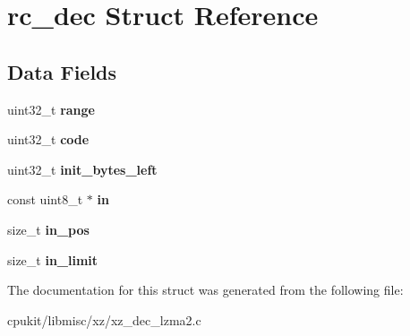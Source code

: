 \hypertarget{structrc__dec}{}\section{rc\+\_\+dec Struct Reference}
\label{structrc__dec}
\subsection*{Data Fields}
\begin{DoxyCompactItemize}
\item 
\mbox{\label{structrc__dec_a0b30be2ebf0215cdeaaa3d5a28b8e4e2}} 
uint32\+\_\+t {\bfseries range}
\item 
\mbox{\label{structrc__dec_a78845f77e6d0849c6861a5fa3f26940d}} 
uint32\+\_\+t {\bfseries code}
\item 
\mbox{\label{structrc__dec_a16ad52a1ab5f74a06dc55228de488b61}} 
uint32\+\_\+t {\bfseries init\+\_\+bytes\+\_\+left}
\item 
\mbox{\label{structrc__dec_a9415903a7f9f60e0ce6606adcc0eae73}} 
const uint8\+\_\+t $\ast$ {\bfseries in}
\item 
\mbox{\label{structrc__dec_abc7d1a6fc8e59e4c5d58fd26407bf1ab}} 
size\+\_\+t {\bfseries in\+\_\+pos}
\item 
\mbox{\label{structrc__dec_adbb505b4d972fd84620c936fbbbf6968}} 
size\+\_\+t {\bfseries in\+\_\+limit}
\end{DoxyCompactItemize}


The documentation for this struct was generated from the following file\+:\begin{DoxyCompactItemize}
\item 
cpukit/libmisc/xz/xz\+\_\+dec\+\_\+lzma2.\+c\end{DoxyCompactItemize}
